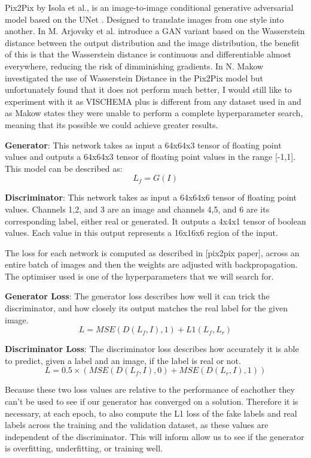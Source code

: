 \documentclass{UoYCSproject}
\begin{document}
Pix2Pix by Isola et al.\cite{isola2018imagetoimage}, is an image-to-image conditional generative adversarial model based on the UNet \cite{ronneberger2015unet}. Designed to translate images from one style into another. In \cite{arjovsky2017wasserstein} M. Arjovsky et al. introduce a GAN variant based on the Wasserstein distance between the output distribution and the image distribution, the benefit of this is that the Wasserstein distance is continuous and differentiable almost everywhere, reducing the risk of dimminishing gradients. In \cite{pix2pixwasserstein} N. Makow investigated the use of Wasserstein Distance in the Pix2Pix model but unfortunately found that it does not perform much better, I would still like to experiment with it as VISCHEMA plus is different from any dataset used in \cite{isola2018imagetoimage} and as Makow states they were unable to perform a complete hyperparameter search, meaning that its possible we could achieve greater results.

\textbf{Generator}: This network takes as input a 64x64x3 tensor of floating point values and outputs a 64x64x3 tensor of floating point values in the range [-1,1]. This model can be described as: \[ L_{f} = G(I) \]

\textbf{Discriminator}: This network takes as input a 64x64x6 tensor of floating point values. Channels 1,2, and 3 are an image and channels 4,5, and 6 are its corresponding label, either real or generated. It outputs a 4x4x1 tensor of boolean values. Each value in this output represents a 16x16x6 region of the input.

The loss for each network is computed as described in [pix2pix paper], across an entire batch of images and then the weights are adjusted with backpropagation. The optimiser used is one of the hyperparameters that we will search for.

\textbf{Generator Loss}: The generator loss describes how well it can trick the discriminator, and how closely its output matches the real label for the given image.
\[ L = MSE( D(L_{f}, I), 1 ) + L1(L_{f}, L_{r}) \]

\textbf{Discriminator Loss}: The discriminator loss describes how accurately it is able to predict, given a label and an image, if the label is real or not.
\[ L = 0.5 \times  ( MSE( D( L_{f}, I ), 0) + MSE( D( L_{r}, I ), 1) ) \]

Because these two loss values are relative to the performance of eachother they can't be used to see if our generator has converged on a solution. Therefore it is necessary, at each epoch, to also compute the L1 loss of the fake labels and real labels across the training and the validation dataset, as these values are independent of the discriminator. This will inform allow us to see if the generator is overfitting, underfitting, or training well. 
\end{document}
